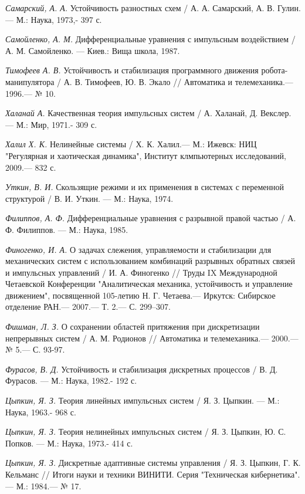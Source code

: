 \begin{thebibliography}{10}
	{\it Самарский, А. А.} Устойчивость разностных схем /
	А. А. Самарский, А. В. Гулин. — М.: Наука, 1973,- 397 с.
	
	{\it Самойленко, А. М.} Дифференциальные уравнения с импульсным воздействием /
	А. М. Самойленко. — Киев.: Вища школа, 1987.
	
	
	{\it Тимофеев А. В.} Устойчивость и стабилизация программного движения робота-манипулятора /
	А. В. Тимофеев, Ю. В. Экало // Автоматика и телемеханика.— 1996.— № 10.
	
	{\it Халанай А.} Качественная теория импульсных систем /
	А. Халанай, Д. Векслер. — М.: Мир, 1971.- 309 с.
	
	{\it Халил Х. К.} Нелинейные системы / Х. К. Халил.— М.: Ижевск: НИЦ "Регулярная и хаотическая динамика", Институт клмпьютерных исследований, 2009.— 832 с.
	
	{\it Уткин, В. И.} Скользящие режими и их применения в системах с переменной структурой /
	В. И. Уткин. — М.: Наука, 1974.
	
	{\it Филиппов, А. Ф.} Дифференциальные уравнения с разрывной правой частью /
	А. Ф. Филиппов. — М.: Наука, 1985.
	
	{\it Финогенко, И. А.} О задачах слежения, управляемости и стабилизации для механических систем с использованием комбинаций разрывных обратных связей и импульсных управлений /
	И. А. Финогенко // Труды IX Международной Четаевской Конференции "Аналитическая механика, устойчивость и управление движением", посвященной 105-летию Н. Г. Четаева.— Иркутск: Сибирское отделение РАН.— 2007.— Т. 2.— С. 299–307.
	
	{\it Фишман, Л. З.} О сохранении областей притяжения при дискретизации непрерывных систем
	/ А. М. Родионов // Автоматика и телемеханика.— 2000.— № 5.— С. 93-97.
	
	{\it Фурасов, В. Д.} Устойчивость и стабилизация дискретных процессов /
	В. Д. Фурасов. — М.: Наука, 1982.- 192 с.
	
	{\it Цыпкин, Я. З.} Теория линейных импульсных систем /
	Я. З. Цыпкин. — М.: Наука, 1963.- 968 с.
	
	{\it Цыпкин, Я. З.} Теория нелинейных импульсных систем /
	Я. З. Цыпкин, Ю. С. Попков. — М.: Наука, 1973.- 414 с.
	
	{\it Цыпкин, Я. З.} Дискретные адаптивные системы управления /
	Я. З. Цыпкин, Г. К. Кельманс // Итоги науки и техники ВИНИТИ. Серия "Техническая кибернетика". — М.: 1984.— № 17.
	

\end{thebibliography}
